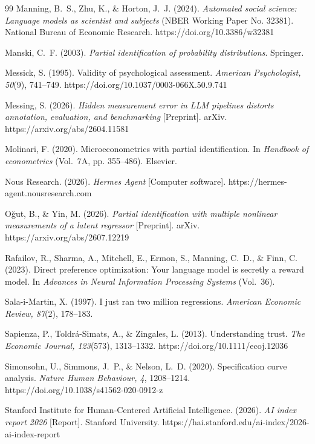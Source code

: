 \documentclass[10pt,letterpaper]{article}
\begin{document}
\begin{thebibliography}{99}
 Manning, B.~S., Zhu, K., \& Horton, J.~J. (2024). \textit{Automated social science: Language models as scientist and subjects} (NBER Working Paper No. 32381). National Bureau of Economic Research. https://doi.org/10.3386/w32381

 Manski, C.~F. (2003). \textit{Partial identification of probability distributions}. Springer.

 Messick, S. (1995). Validity of psychological assessment. \textit{American Psychologist, 50}(9), 741--749. https://doi.org/10.1037/0003-066X.50.9.741

 Messing, S. (2026). \textit{Hidden measurement error in LLM pipelines distorts annotation, evaluation, and benchmarking} [Preprint]. arXiv. https://arxiv.org/abs/2604.11581

 Molinari, F. (2020). Microeconometrics with partial identification. In \textit{Handbook of econometrics} (Vol.~7A, pp. 355--486). Elsevier.

 Nous Research. (2026). \textit{Hermes Agent} [Computer software]. https://hermes-agent.nousresearch.com

 O\u{g}ut, B., \& Yin, M. (2026). \textit{Partial identification with multiple nonlinear measurements of a latent regressor} [Preprint]. arXiv. https://arxiv.org/abs/2607.12219

 Rafailov, R., Sharma, A., Mitchell, E., Ermon, S., Manning, C.~D., \& Finn, C. (2023). Direct preference optimization: Your language model is secretly a reward model. In \textit{Advances in Neural Information Processing Systems} (Vol.~36).

 Sala-i-Martin, X. (1997). I just ran two million regressions. \textit{American Economic Review, 87}(2), 178--183.

 Sapienza, P., Toldr\'a-Simats, A., \& Zingales, L. (2013). Understanding trust. \textit{The Economic Journal, 123}(573), 1313--1332. https://doi.org/10.1111/ecoj.12036

 Simonsohn, U., Simmons, J.~P., \& Nelson, L.~D. (2020). Specification curve analysis. \textit{Nature Human Behaviour, 4}, 1208--1214. https://doi.org/10.1038/s41562-020-0912-z

 Stanford Institute for Human-Centered Artificial Intelligence. (2026). \textit{AI index report 2026} [Report]. Stanford University. https://hai.stanford.edu/ai-index/2026-ai-index-report


\end{thebibliography}
\end{document}
